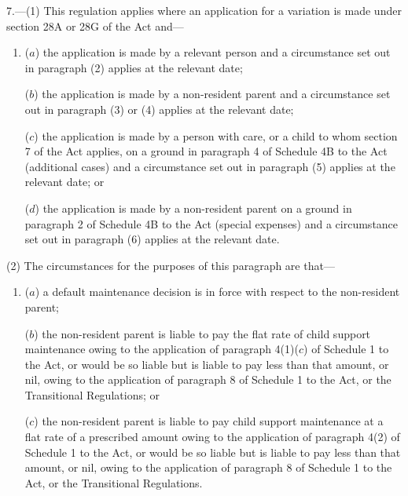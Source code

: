\documentclass[12pt,a4paper]{article}
\begin{document}
7.---(1)  This regulation applies where an application for a variation is made under 
section 28A or 28G  %
of the Act and—
\begin{enumerate}\item[]
($a$) the application is made by a relevant person and a circumstance set out in paragraph (2) applies at the relevant date;

($b$) the application is made by a non-resident parent and a circumstance set out in paragraph (3) or (4) applies at the relevant date;

($c$) the application is made by a person with care, or a child to whom section 7 of the Act applies, on a ground in paragraph 4 of Schedule 4B to the Act (additional cases) and a circumstance set out in paragraph (5) applies at the relevant date; or

($d$) the application is made by a non-resident parent on a ground in paragraph 2 of Schedule 4B to the Act (special expenses) and a circumstance set out in paragraph (6) applies at the relevant date.
\end{enumerate}

(2) The circumstances for the purposes of this paragraph are that—
\begin{enumerate}\item[]
($a$) a default maintenance decision is in force with respect to the non-resident parent;

($b$) the non-resident parent is liable to pay the flat rate of child support maintenance owing to the application of paragraph 4(1)($c$)  of Schedule 1 to the Act, or would be so liable but is liable to pay less than that amount, or nil, owing to the application of paragraph 8 of Schedule 1 to the Act, or the Transitional Regulations; or

($c$) the non-resident parent is liable to pay child support maintenance at a flat rate of a prescribed amount owing to the application of paragraph 4(2) of Schedule 1 to the Act, or would be so liable but is liable to pay less than that amount, or nil, owing to the application of paragraph 8 of Schedule 1 to the Act, or the Transitional Regulations.
\end{enumerate}
\end{document}
